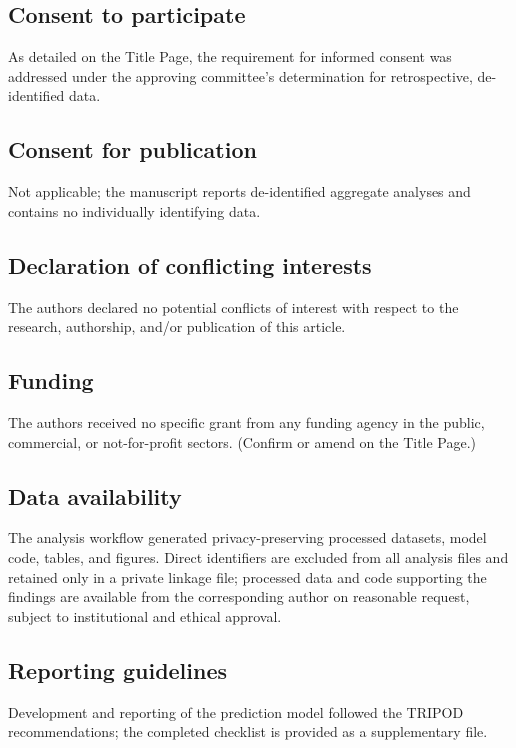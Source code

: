 \documentclass[11pt]{article}
\begin{document}
\subsection*{Consent to participate}
As detailed on the Title Page, the requirement for informed consent was
addressed under the approving committee's determination for retrospective,
de-identified data.

\subsection*{Consent for publication}
Not applicable; the manuscript reports de-identified aggregate analyses and
contains no individually identifying data.

\subsection*{Declaration of conflicting interests}
The authors declared no potential conflicts of interest with respect to the
research, authorship, and/or publication of this article.

\subsection*{Funding}
The authors received no specific grant from any funding agency in the
public, commercial, or not-for-profit sectors. (Confirm or amend on the
Title Page.)

\subsection*{Data availability}
The analysis workflow generated privacy-preserving processed datasets,
model code, tables, and figures. Direct identifiers are excluded from all
analysis files and retained only in a private linkage file; processed data
and code supporting the findings are available from the corresponding
author on reasonable request, subject to institutional and ethical
approval.

\subsection*{Reporting guidelines}
Development and reporting of the prediction model followed the TRIPOD
recommendations; the completed checklist is provided as a supplementary
file.



\end{document}
